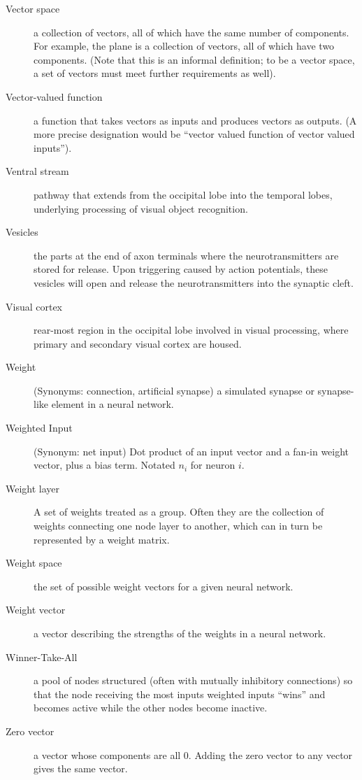 \begin{description}
\item[Vector space] a collection of vectors, all of which have the same number of components. For example, the plane is a collection of vectors, all of which have two components. (Note that this is an  informal definition; to be a vector space, a set of vectors must meet further requirements as well).

\item[Vector-valued function] a function that takes vectors as inputs and produces vectors as outputs. (A more precise designation would be ``vector valued function of vector valued inputs''). 

\item[Ventral stream] pathway that extends from the occipital lobe into the temporal lobes, underlying processing of visual object recognition. 

\item[Vesicles] the parts at the end of axon terminals where the neurotransmitters are stored for release. Upon triggering caused by action potentials, these vesicles will open and release the neurotransmitters into the synaptic cleft.

\item[Visual cortex] rear-most region in the occipital lobe involved in visual processing, where primary and secondary visual cortex are housed.

\item[Weight] (Synonyms: connection, artificial synapse) a simulated synapse or synapse-like element in a neural network. 

\item[Weighted Input] (Synonym: net input)  Dot product of an input vector and a fan-in weight vector, plus a bias term. Notated $n_i$ for neuron $i$.

\item[Weight layer] A set of weights treated as a group. Often they are the collection of weights connecting one node layer to another, which can in turn be represented by a weight matrix. %

\item[Weight space] the set of possible weight vectors for a given neural network.

\item[Weight vector] a vector describing the strengths of the weights in a neural network.

\item[Winner-Take-All] a pool of nodes structured (often with mutually inhibitory connections) so that the node receiving the most inputs weighted inputs ``wins'' and becomes active while the other nodes become inactive.

\item[Zero vector] a vector whose components are all $0$. Adding the zero vector to any vector gives the same vector.

\end{description}